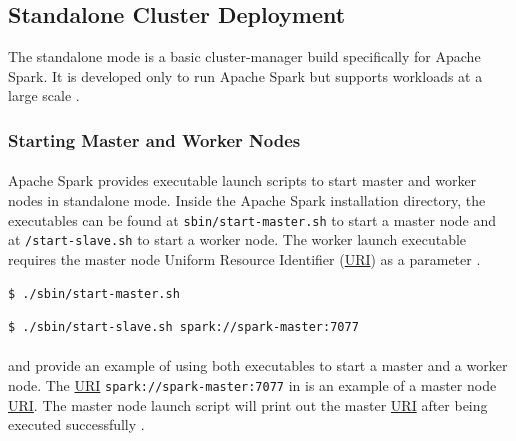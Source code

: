 \subsection{Standalone Cluster Deployment}
\label{subsec:04_spark_standalone}
The standalone mode is a basic cluster-manager build specifically for Apache Spark. It is developed only to run Apache Spark but supports workloads at a large scale \cite{Chambers2018Spark}.


\subsubsection{Starting Master and Worker Nodes}
\paragraph{}
Apache Spark provides executable launch scripts to start master and worker nodes in standalone mode.
Inside the Apache Spark installation directory, the executables can be found at \texttt{sbin/start-master.sh} to start a master node and at \texttt{/start-slave.sh} to start a worker node.
The worker launch executable requires the master node Uniform Resource Identifier (\hyperlink{abbr:uri}{URI}) as a parameter \cite{Apache2020Spark}. 


\begin{lstlisting}[label=lst:04_spark_standalone_launch-master, caption=Usage of master launch script, language=bash, numbers=none]
$ ./sbin/start-master.sh
\end{lstlisting}


\begin{lstlisting}[label=lst:04_spark_standalone_launch-worker, caption=Usage of worker launch script, language=bash, numbers=none]
$ ./sbin/start-slave.sh spark://spark-master:7077
\end{lstlisting}


\paragraph{} and  provide an example of using both executables to start a master and a worker node. The \hyperlink{abbr:uri}{URI} \texttt{spark://spark-master:7077} in  is an example of a master node \hyperlink{abbr:uri}{URI}. The master node launch script will print out the master \hyperlink{abbr:uri}{URI} after being executed successfully \cite{Apache2020Spark}.


